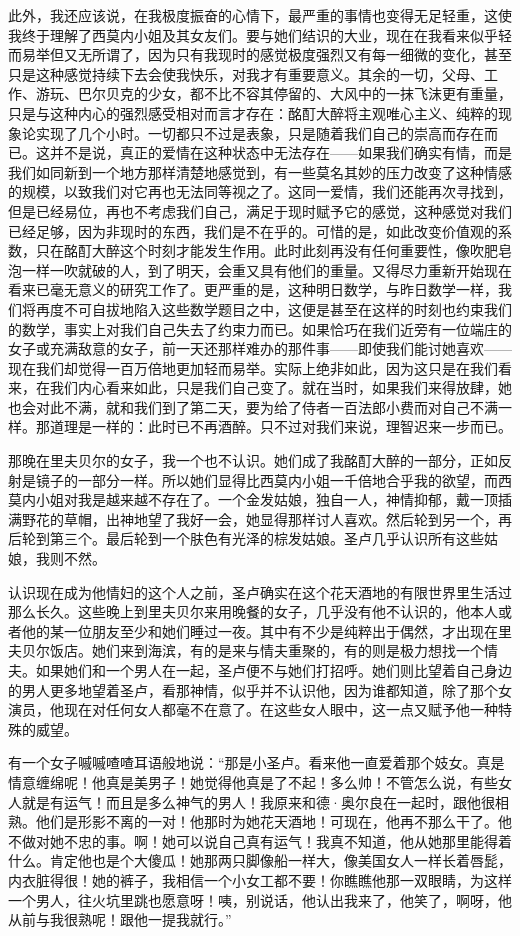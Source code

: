 \par 此外，我还应该说，在我极度振奋的心情下，最严重的事情也变得无足轻重，这使我终于理解了西莫内小姐及其女友们。要与她们结识的大业，现在在我看来似乎轻而易举但又无所谓了，因为只有我现时的感觉极度强烈又有每一细微的变化，甚至只是这种感觉持续下去会使我快乐，对我才有重要意义。其余的一切，父母、工作、游玩、巴尔贝克的少女，都不比不容其停留的、大风中的一抹飞沫更有重量，只是与这种内心的强烈感受相对而言才存在：酩酊大醉将主观唯心主义、纯粹的现象论实现了几个小时。一切都只不过是表象，只是随着我们自己的崇高而存在而已。这并不是说，真正的爱情在这种状态中无法存在——如果我们确实有情，而是我们如同新到一个地方那样清楚地感觉到，有一些莫名其妙的压力改变了这种情感的规模，以致我们对它再也无法同等视之了。这同一爱情，我们还能再次寻找到，但是已经易位，再也不考虑我们自己，满足于现时赋予它的感觉，这种感觉对我们已经足够，因为非现时的东西，我们是不在乎的。可惜的是，如此改变价值观的系数，只在酩酊大醉这个时刻才能发生作用。此时此刻再没有任何重要性，像吹肥皂泡一样一吹就破的人，到了明天，会重又具有他们的重量。又得尽力重新开始现在看来已毫无意义的研究工作了。更严重的是，这种明日数学，与昨日数学一样，我们将再度不可自拔地陷入这些数学题目之中，这便是甚至在这样的时刻也约束我们的数学，事实上对我们自己失去了约束力而已。如果恰巧在我们近旁有一位端庄的女子或充满敌意的女子，前一天还那样难办的那件事——即使我们能讨她喜欢——现在我们却觉得一百万倍地更加轻而易举。实际上绝非如此，因为这只是在我们看来，在我们内心看来如此，只是我们自己变了。就在当时，如果我们来得放肆，她也会对此不满，就和我们到了第二天，要为给了侍者一百法郎小费而对自己不满一样。那道理是一样的：此时已不再酒醉。只不过对我们来说，理智迟来一步而已。
\par 那晚在里夫贝尔的女子，我一个也不认识。她们成了我酩酊大醉的一部分，正如反射是镜子的一部分一样。所以她们显得比西莫内小姐一千倍地合乎我的欲望，而西莫内小姐对我是越来越不存在了。一个金发姑娘，独自一人，神情抑郁，戴一顶插满野花的草帽，出神地望了我好一会，她显得那样讨人喜欢。然后轮到另一个，再后轮到第三个。最后轮到一个肤色有光泽的棕发姑娘。圣卢几乎认识所有这些姑娘，我则不然。
\par 认识现在成为他情妇的这个人之前，圣卢确实在这个花天酒地的有限世界里生活过那么长久。这些晚上到里夫贝尔来用晚餐的女子，几乎没有他不认识的，他本人或者他的某一位朋友至少和她们睡过一夜。其中有不少是纯粹出于偶然，才出现在里夫贝尔饭店。她们来到海滨，有的是来与情夫重聚的，有的则是极力想找一个情夫。如果她们和一个男人在一起，圣卢便不与她们打招呼。她们则比望着自己身边的男人更多地望着圣卢，看那神情，似乎并不认识他，因为谁都知道，除了那个女演员，他现在对任何女人都毫不在意了。在这些女人眼中，这一点又赋予他一种特殊的威望。
\par 有一个女子嘁嘁喳喳耳语般地说：“那是小圣卢。看来他一直爱着那个妓女。真是情意缠绵呢！他真是美男子！她觉得他真是了不起！多么帅！不管怎么说，有些女人就是有运气！而且是多么神气的男人！我原来和德·奥尔良在一起时，跟他很相熟。他们是形影不离的一对！他那时为她花天酒地！可现在，他再不那么干了。他不做对她不忠的事。啊！她可以说自己真有运气！我真不知道，他从她那里能得着什么。肯定他也是个大傻瓜！她那两只脚像船一样大，像美国女人一样长着唇髭，内衣脏得很！她的裤子，我相信一个小女工都不要！你瞧瞧他那一双眼睛，为这样一个男人，往火坑里跳也愿意呀！咦，别说话，他认出我来了，他笑了，啊呀，他从前与我很熟呢！跟他一提我就行。”
